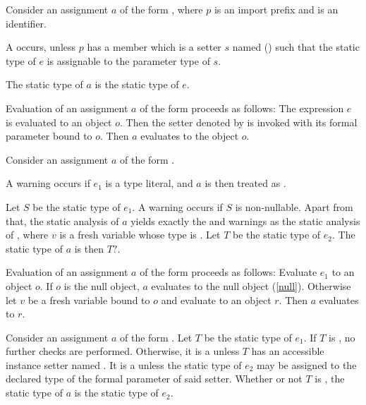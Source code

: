 \documentclass[makeidx]{article}
\begin{document}
\LMHash{}%
Consider an assignment $a$ of the form ,
where $p$ is an import prefix and \id{} is an identifier.

\LMHash{}%
A  occurs,
unless $p$ has a member which is a setter $s$ named 
()
such that the static type of $e$
is assignable to the parameter type of $s$.

\LMHash{}%
The static type of $a$ is the static type of $e$.

\LMHash{}%
Evaluation of an assignment $a$ of the form 
proceeds as follows:
The expression $e$ is evaluated to an object $o$.
Then the setter denoted by  is invoked
with its formal parameter bound to $o$.
Then $a$ evaluates to the object $o$.
\EndCase

\LMHash{}%
Consider an assignment $a$ of the form .

\LMHash{}%
A warning occurs if $e_1$ is a type literal,
and $a$ is then treated as .

\LMHash{}%
Let $S$ be the static type of $e_1$.
A warning occurs if $S$ is non-nullable.
Apart from that,
the static analysis of $a$ yields
exactly the  and warnings as
the static analysis of ,
where $v$ is a fresh variable whose type is .
Let $T$ be the static type of $e_2$.
The static type of $a$ is then $T?$.

\LMHash{}%
Evaluation of an assignment $a$ of the form 
proceeds as follows:
Evaluate $e_1$ to an object $o$.
If $o$ is the null object, $a$ evaluates to the null object (\ref{null}).
Otherwise let $v$ be a fresh variable bound to $o$
and evaluate  to an object $r$.
Then $a$ evaluates to $r$.
\EndCase

\LMHash{}%
Consider an assignment $a$ of the form .
Let $T$ be the static type of $e_1$.
If $T$ is \DYNAMIC, no further checks are performed.
Otherwise, it is a  unless
$T$ has an accessible instance setter named .
It is a  unless the static type of $e_2$
may be assigned to the declared type of the formal parameter of said setter.
Whether or not $T$ is \DYNAMIC,
the static type of $a$ is the static type of $e_2$.
\end{document}
